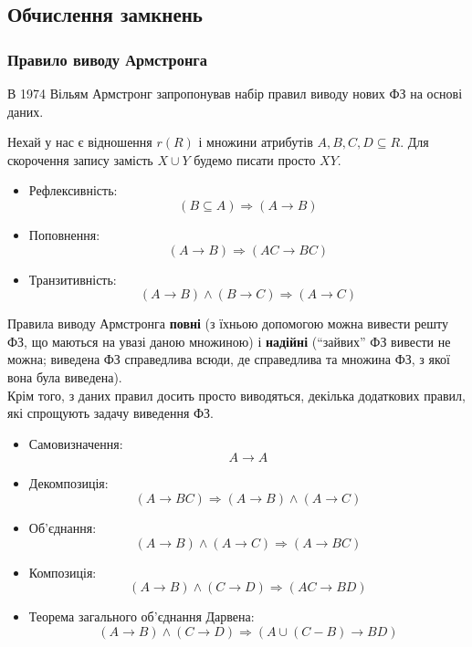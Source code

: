 \subsection{Обчислення замкнень}

\subsubsection{Правило виводу Армстронга}

В 1974 Вільям Армстронг запропонував набір правил виводу нових ФЗ на основі даних.

Нехай у нас є відношення $r\left(R\right)$ і множини атрибутів $A,B,C,D\subseteq R$. Для скорочення запису замість $X\cup Y$ будемо писати просто $XY$.

\begin{itemize}
	\item Рефлексивність:
	\[ \left(B\subseteq A\right)\Rightarrow \left(A\to B\right) \]
	
	\item Поповнення:
	\[ \left(A\to B\right)\Rightarrow \left(AC\to BC\right) \]

	\item Транзитивність:
	\[ \left(A\to B\right)\wedge \left(B\to C\right)\Rightarrow \left(A\to C\right) \]
\end{itemize}

Правила виводу Армстронга \textbf{повні} (з їхньою допомогою можна вивести решту ФЗ, що маються на увазі даною множиною) і \textbf{надійні} (``зайвих'' ФЗ вивести не можна; виведена ФЗ справедлива всюди, де справедлива та множина ФЗ, з якої вона була виведена). \\

Крім того, з даних правил досить просто виводяться, декілька додаткових правил, які спрощують задачу виведення ФЗ.

\begin{itemize}
	\item Самовизначення:
	\[ A\to A \]

	\item Декомпозиція:
	\[ \left(A\to BC\right)\Rightarrow \left(A\to B\right)\wedge \left(A\to C\right) \]
	
	\item Об'єднання:
	\[ \left(A\to B\right)\wedge \left(A\to C\right)\Rightarrow \left(A\to BC\right) \]

	\item Композиція:
	\[ \left(A\to B\right)\wedge \left(C\to D\right)\Rightarrow \left(AC\to BD\right) \]
	
	\item Теорема загального об'єднання Дарвена:
	\[ \left(A\to B\right)\wedge \left(C\to D\right)\Rightarrow \left(A\cup \left(C-B\right)\to BD\right) \]
\end{itemize}

